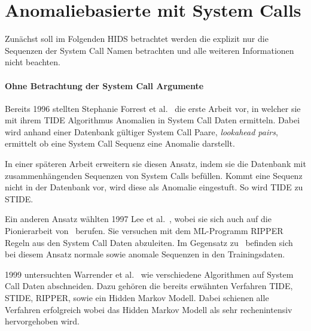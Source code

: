     \section{Anomaliebasierte  mit System Calls}

        Zunächst soll im Folgenden \ac{HIDS} betrachtet werden die explizit nur die Sequenzen der System Call Namen betrachten und alle weiteren Informationen nicht beachten.

        \paragraph{Ohne Betrachtung der System Call Argumente}\label{sec:related_no_arg}
                Bereits 1996 stellten Stephanie Forrest et al.~\cite{FORREST} die erste Arbeit vor, in welcher sie mit ihrem \ac{TIDE} Algorithmus Anomalien in System Call Daten ermitteln.
                Dabei wird anhand einer Datenbank gültiger System Call Paare, \textit{lookahead pairs}, ermittelt ob eine System Call Sequenz eine Anomalie darstellt.

                In einer späteren Arbeit erweitern sie diesen Ansatz, indem sie die Datenbank mit zusammenhängenden Sequenzen von System Calls befüllen.
                Kommt eine Sequenz nicht in der Datenbank vor, wird diese als Anomalie eingestuft.
                So wird \ac{TIDE} zu \ac{STIDE}.~\cite{STIDE}

                Ein anderen Ansatz wählten 1997 Lee et al.~\cite{LEE1997}, wobei sie sich auch auf die Pionierarbeit von~\cite{FORREST} berufen.
                Sie versuchen mit dem \ac{ML}-Programm RIPPER Regeln aus den System Call Daten abzuleiten.
                Im Gegensatz zu~\cite{FORREST} befinden sich bei diesem Ansatz normale sowie anomale Sequenzen in den Trainingsdaten.

                1999 untersuchten Warrender et al.~\cite{STIDE_Alternatives} wie verschiedene Algorithmen auf System Call Daten abschneiden.
                Dazu gehören die bereits erwähnten Verfahren \ac{TIDE}, \ac{STIDE}, RIPPER, sowie ein Hidden Markov Modell.
                Dabei schienen alle Verfahren erfolgreich wobei das Hidden Markov Modell als sehr rechenintensiv hervorgehoben wird.
         
